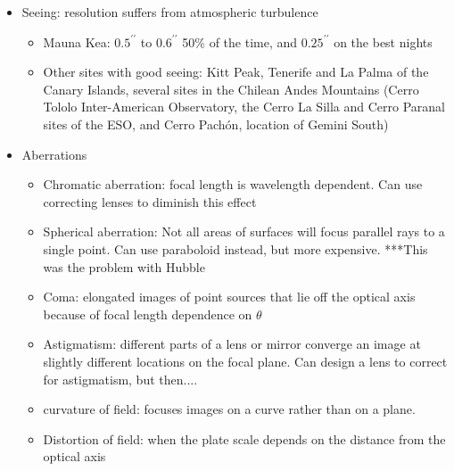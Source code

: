 \documentclass[12pt]{article}
\begin{document}
\begin{itemize}
\item Seeing: resolution suffers from atmospheric turbulence
\begin{itemize}
\item Mauna Kea: $0.5^{\prime\prime}$ to $0.6^{\prime\prime}$ 50\% of the time, and $0.25^{\prime\prime}$ on the best nights
\item Other sites with good seeing: Kitt Peak, Tenerife and La Palma of the Canary Islands, several sites in the Chilean Andes Mountains (Cerro Tololo Inter-American Observatory, the Cerro La Silla and Cerro Paranal sites of the ESO, and Cerro Pach\'on, location of Gemini South)
\end{itemize}
\item Aberrations
\begin{itemize}
\item Chromatic aberration: focal length is wavelength dependent. Can use correcting lenses to diminish this effect
\item Spherical aberration: Not all areas of surfaces will focus parallel rays to a single point. Can use paraboloid instead, but more expensive. ***This was the problem with Hubble
\item Coma: elongated images of point sources that lie off the optical axis because of focal length dependence on $\theta$
\item Astigmatism: different parts of a lens or mirror converge an image at slightly different locations on the focal plane. Can design a lens to correct for astigmatism, but then....
\item curvature of field: focuses images on a curve rather than on a plane.
\item Distortion of field: when the plate scale depends on the distance from the optical axis
\end{itemize}


\end{itemize}
\end{document}
